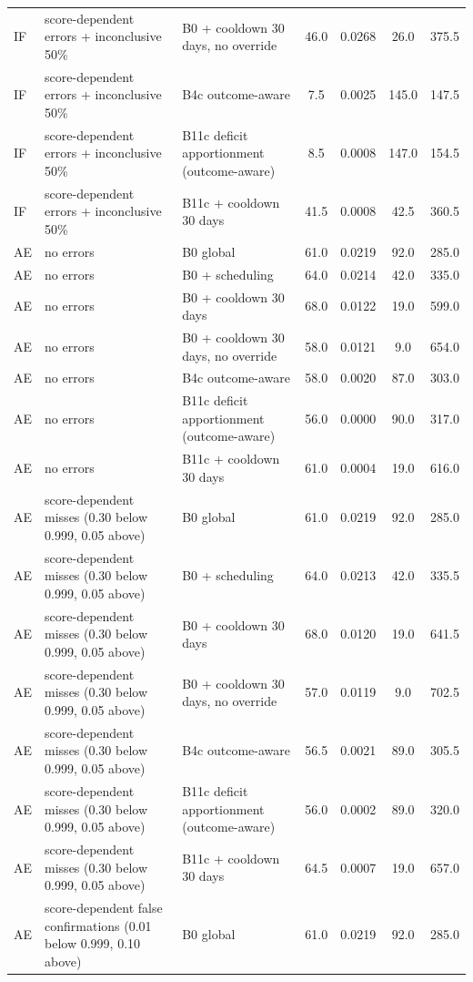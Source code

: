 \begin{longtable}{lp{5.2cm}p{4.4cm}cccc}
IF & score-dependent errors + inconclusive 50\% & B0 + cooldown 30 days, no override & 46.0 & 0.0268 & 26.0 & 375.5 \\
IF & score-dependent errors + inconclusive 50\% & B4c outcome-aware & 7.5 & 0.0025 & 145.0 & 147.5 \\
IF & score-dependent errors + inconclusive 50\% & B11c deficit apportionment (outcome-aware) & 8.5 & 0.0008 & 147.0 & 154.5 \\
IF & score-dependent errors + inconclusive 50\% & B11c + cooldown 30 days & 41.5 & 0.0008 & 42.5 & 360.5 \\
AE & no errors & B0 global & 61.0 & 0.0219 & 92.0 & 285.0 \\
AE & no errors & B0 + scheduling & 64.0 & 0.0214 & 42.0 & 335.0 \\
AE & no errors & B0 + cooldown 30 days & 68.0 & 0.0122 & 19.0 & 599.0 \\
AE & no errors & B0 + cooldown 30 days, no override & 58.0 & 0.0121 & 9.0 & 654.0 \\
AE & no errors & B4c outcome-aware & 58.0 & 0.0020 & 87.0 & 303.0 \\
AE & no errors & B11c deficit apportionment (outcome-aware) & 56.0 & 0.0000 & 90.0 & 317.0 \\
AE & no errors & B11c + cooldown 30 days & 61.0 & 0.0004 & 19.0 & 616.0 \\
AE & score-dependent misses (0.30 below 0.999, 0.05 above) & B0 global & 61.0 & 0.0219 & 92.0 & 285.0 \\
AE & score-dependent misses (0.30 below 0.999, 0.05 above) & B0 + scheduling & 64.0 & 0.0213 & 42.0 & 335.5 \\
AE & score-dependent misses (0.30 below 0.999, 0.05 above) & B0 + cooldown 30 days & 68.0 & 0.0120 & 19.0 & 641.5 \\
AE & score-dependent misses (0.30 below 0.999, 0.05 above) & B0 + cooldown 30 days, no override & 57.0 & 0.0119 & 9.0 & 702.5 \\
AE & score-dependent misses (0.30 below 0.999, 0.05 above) & B4c outcome-aware & 56.5 & 0.0021 & 89.0 & 305.5 \\
AE & score-dependent misses (0.30 below 0.999, 0.05 above) & B11c deficit apportionment (outcome-aware) & 56.0 & 0.0002 & 89.0 & 320.0 \\
AE & score-dependent misses (0.30 below 0.999, 0.05 above) & B11c + cooldown 30 days & 64.5 & 0.0007 & 19.0 & 657.0 \\
AE & score-dependent false confirmations (0.01 below 0.999, 0.10 above) & B0 global & 61.0 & 0.0219 & 92.0 & 285.0 \\

\end{longtable}
